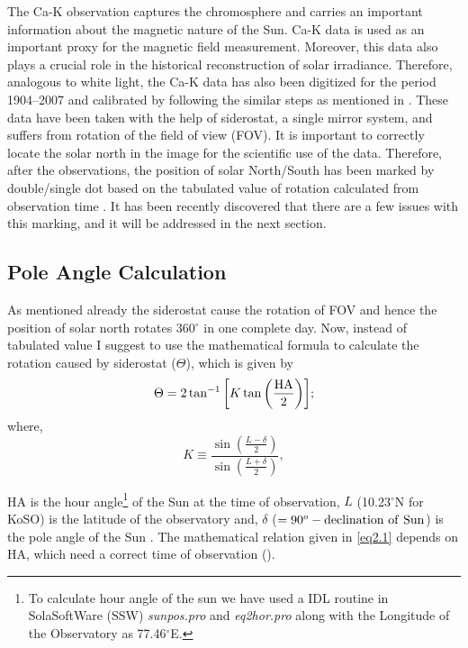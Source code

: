 The Ca-K observation captures the chromosphere and carries an important information about the magnetic nature of the Sun. Ca-K data is used as an important proxy for the magnetic field measurement. Moreover, this data also plays a crucial role in the historical reconstruction of solar irradiance. Therefore, analogous to white light, the Ca-K data has also been digitized for the period 1904--2007 and calibrated by following the similar steps as mentioned in . These data have been taken with the help of siderostat, a single mirror system, and suffers from rotation of the field of view (FOV). It is important to correctly locate the solar north in the image for the scientific use of the data. Therefore, after the observations, the position of solar North/South has been marked by double/single dot based on the tabulated value of rotation calculated from observation time \citep{Priyal2014b}. It has been recently discovered that there are a few issues with this marking, and it will be addressed in the next section.


\subsection{Pole Angle Calculation}
\label{ch2-pole}

As mentioned already the siderostat cause the rotation of FOV and hence the position of solar north rotates 360$^\circ$  in one complete day. Now, instead of tabulated value I suggest to use the mathematical formula to calculate the rotation caused by siderostat ($\Theta$), which is given by
%
\begin{equation}
    \Theta = 2\tan^{-1}{\left[ K\tan{\left( \frac{{\rm HA}}{2}\right)}\right]};
    \label{eq2.1}
\end{equation}
where,
\begin{equation*}
    K \equiv \frac{\sin{\left( \frac{L-\delta}{2}\right)}}{\sin{\left( \frac{L+\delta}{2}\right)}},
\end{equation*}
    
{\rm HA} is the hour angle\footnote{To calculate hour angle of the sun we have used a IDL routine in SolaSoftWare (SSW) {\it sunpos.pro} and {\it eq2hor.pro} along with the Longitude of the Observatory as 77.46$^\circ$E.} of the Sun at the time of observation, $L$ (10.23$^\circ$N for KoSO) is the latitude of the observatory and, $\delta$ ($=90^o - {\rm declination~of~Sun}$) is the pole angle of the Sun \citep{Cornu1900}. The mathematical relation given in \autoref{eq2.1} depends on HA, which need a correct time of observation (\tobs). 
    
